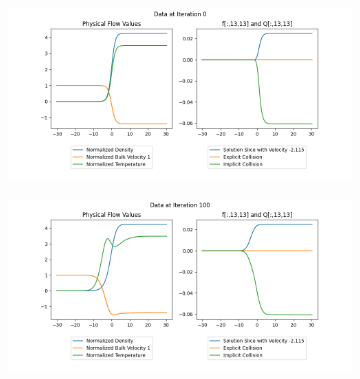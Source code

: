 \documentclass{article}
\begin{document}
\begin{figure}[H]
  \centering
  \begin{subfigure}[b]{\textwidth}
  \includegraphics[width=\textwidth]{imgs/time_step/output_explicit/0.png}
  \end{subfigure}
  \hfill
  \begin{subfigure}[b]{\textwidth}
  \includegraphics[width=\textwidth]{imgs/time_step/output_explicit/100.png}
  \end{subfigure}
\end{figure}
  
\end{document}
